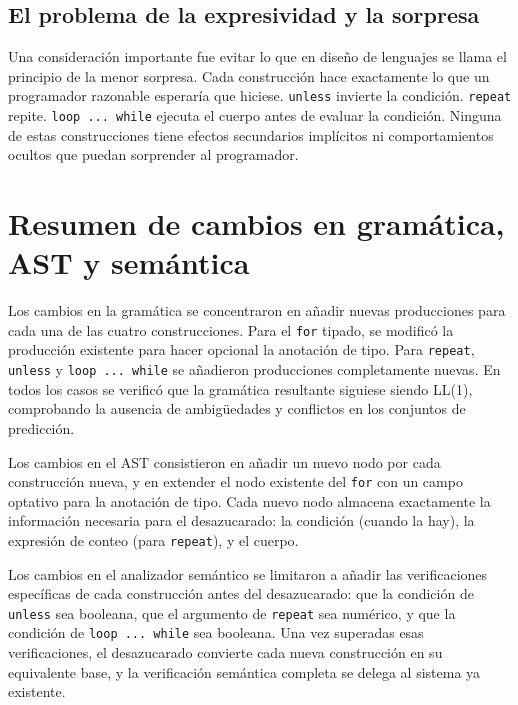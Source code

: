 \documentclass[12pt, a4paper]{article}
\begin{document}
\subsection{El problema de la expresividad y la sorpresa}

Una consideración importante fue evitar lo que en diseño de lenguajes se llama el principio de la menor sorpresa. Cada construcción hace exactamente lo que un programador razonable esperaría que hiciese. \texttt{unless} invierte la condición. \texttt{repeat} repite. \texttt{loop~...~while} ejecuta el cuerpo antes de evaluar la condición. Ninguna de estas construcciones tiene efectos secundarios implícitos ni comportamientos ocultos que puedan sorprender al programador.

\section{Resumen de cambios en gramática, AST y semántica}

Los cambios en la gramática se concentraron en añadir nuevas producciones para cada una de las cuatro construcciones. Para el \texttt{for} tipado, se modificó la producción existente para hacer opcional la anotación de tipo. Para \texttt{repeat}, \texttt{unless} y \texttt{loop~...~while} se añadieron producciones completamente nuevas. En todos los casos se verificó que la gramática resultante siguiese siendo LL(1), comprobando la ausencia de ambigüedades y conflictos en los conjuntos de predicción.

Los cambios en el AST consistieron en añadir un nuevo nodo por cada construcción nueva, y en extender el nodo existente del \texttt{for} con un campo optativo para la anotación de tipo. Cada nuevo nodo almacena exactamente la información necesaria para el desazucarado: la condición (cuando la hay), la expresión de conteo (para \texttt{repeat}), y el cuerpo.

Los cambios en el analizador semántico se limitaron a añadir las verificaciones específicas de cada construcción antes del desazucarado: que la condición de \texttt{unless} sea booleana, que el argumento de \texttt{repeat} sea numérico, y que la condición de \texttt{loop~...~while} sea booleana. Una vez superadas esas verificaciones, el desazucarado convierte cada nueva construcción en su equivalente base, y la verificación semántica completa se delega al sistema ya existente.
\end{document}
